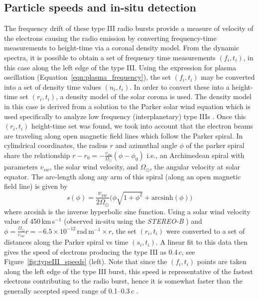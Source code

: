 \subsection{Particle speeds and in-situ detection}
The frequency drift of these type III radio bursts provide a measure of velocity of the electrons causing the radio emission by converting frequency-time measurements to height-time via a coronal density model. From the dynamic spectra, it is possible to obtain a set of frequency time measurements $(f_i,t_i)$, in this case along the left edge of the type III. Using the expression for plasma oscillation (Equation~\ref{eqn:plasma_frequency}), the set $(f_i,t_i)$ may be converted into a set of density time values $(n_i,t_i)$. In order to convert these into a height-time set $(r_i,t_i)$, a density model of the solar corona is used. The density model in this case is derived from a solution to the Parker solar wind equation which is used specifically to analyze low frequency (interplanetary) type IIIs \citep{Mann1999}. Once this $(r_i,t_i)$ height-time set was found, we took into account that the electron beams are traveling along open magnetic field lines which follow the Parker spiral. In cylindrical coordinates, the radius $r$ and azimuthal angle $\phi$ of the parker spiral share the relationship $r-r_0= -\frac{v_{sw}}{\Omega_{\odot}}( \phi - \phi_0)$ i.e., an Archimedean spiral with parameters $v_{sw}$, the solar wind velocity, and $\Omega_{\odot}$, the angular velocity at solar equator. The arc-length along any arm of this spiral (along an open magnetic field line) is given by
\begin{equation}
s(\phi) = \frac{v_{sw}} {2\Omega_{\odot}}\big(\phi\sqrt{1+\phi^2} + \mathrm{arcsinh}(\phi)  \big)
\end{equation}
where arcsinh is the inverse hyperbolic sine function. Using a solar wind velocity value of 450\,km\,s$^{-1}$ (observed in-situ using the \emph{STEREO-B} \citep[PLASTIC;][]{galvin2008}) and $\phi=\frac{ \Omega_{\odot}}{v_{sw}}r=-6.5\times10^{-12}$\,rad\,m$^{-1}\times r$, the set $(r_i,t_i)$ were converted to a set of distances along the Parker spiral vs time $(s_i, t_i)$. A linear fit to this data then gives the speed of electrons producing the type III as 0.4\,$c$, see Figure~\ref{fig:typeIII_speeds} (left). Note that since the $(f_i, t_i)$ points are taken along the left edge of the type III burst, {\color{blue} this speed is representative of the fastest electrons contributing to the radio burst, hence it is somewhat faster than the generally accepted speed range of 0.1--0.3\,$c$ \citep{Saint-Hilaire2013}.} 

